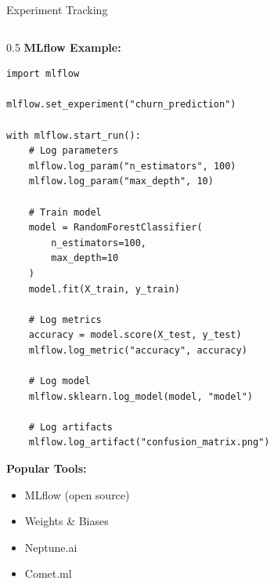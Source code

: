 \begin{frame}{Experiment Tracking}
\begin{columns}
\begin{column}{0.5\textwidth}
\textbf{MLflow Example:}

\begin{verbatim}
import mlflow

mlflow.set_experiment("churn_prediction")

with mlflow.start_run():
    # Log parameters
    mlflow.log_param("n_estimators", 100)
    mlflow.log_param("max_depth", 10)

    # Train model
    model = RandomForestClassifier(
        n_estimators=100,
        max_depth=10
    )
    model.fit(X_train, y_train)

    # Log metrics
    accuracy = model.score(X_test, y_test)
    mlflow.log_metric("accuracy", accuracy)

    # Log model
    mlflow.sklearn.log_model(model, "model")

    # Log artifacts
    mlflow.log_artifact("confusion_matrix.png")
\end{verbatim}

\vspace{0.2cm}

\textbf{Popular Tools:}
\begin{itemize}
\item MLflow (open source)
\item Weights \& Biases
\item Neptune.ai
\item Comet.ml
\end{itemize}
\end{column}
\end{columns}
\end{frame}

